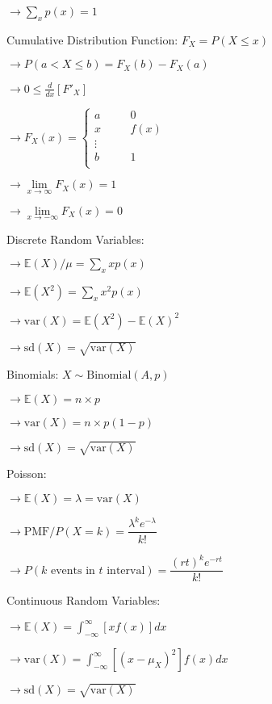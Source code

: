 \documentclass[10pt, letterpaper]{paper}
\begin{document}
\begin{multicols*}{2}
        $\rightarrow \sum\limits_{x}p(x) = 1$

        Cumulative Distribution Function: $F_{X} = P(X \leq x)$

        $\rightarrow P(a < X \leq b) = F_{X}(b) - F_{X}(a)$

        $\rightarrow 0 \leq \frac{d}{dx}[F'_{X}]$

        $\rightarrow F_{X}(x) = 
            \left\{
                \begin{array}{lcl}
                    a & \quad & 0   \\
                    x & \quad & f(x)\\
                    \vdots
                    &&              \\
                    b & \quad & 1   \\
                \end{array}
            \right.
        $

        $\rightarrow \lim\limits_{x \to \infty}F_{X}(x) = 1$

        $\rightarrow \lim\limits_{x \to -\infty}F_{X}(x) = 0$

        Discrete Random Variables:

        $\rightarrow\mathbb{E}(X)/\mu = \sum\limits_{x}xp(x)$

        $\rightarrow\mathbb{E}(X^{2}) = \sum\limits_{x}x^{2}p(x)$

        $\rightarrow\text{var}(X) = \mathbb{E}(X^{2}) - \mathbb{E}(X)^{2}$

        $\rightarrow\text{sd}(X) = \sqrt{\text{var}(X)}$
        
        Binomials: $X \sim \text{Binomial}(A, p)$
        
        $\rightarrow\mathbb{E}(X) = n \times p$
        
        $\rightarrow\text{var}(X) = n \times p(1-p)$
        
        $\rightarrow\text{sd}(X) = \sqrt{\text{var}(X)}$

        \columnbreak

        Poisson:

        $\rightarrow\mathbb{E}(X) = \lambda = \text{var}(X)$

        $\rightarrow\text{PMF}/P(X=k) = \dfrac{\lambda^{k}e^{-\lambda}}{k!}$

        $\rightarrow P(\text{$k$ events in $t$ interval}) = \dfrac{(rt)^{k}e^{-rt}}{k!}$      

        Continuous Random Variables: 
        
        $\rightarrow\mathbb{E}(X) = \int_{-\infty}^{\infty}\left[xf(x)\right]dx$ 
        
        $\rightarrow\text{var}(X) = \int_{-\infty}^{\infty}\left[(x - \mu_X)^2\right]f(x)dx$
        
        $\rightarrow\text{sd}(X) = \sqrt{\text{var}(X)}$
    \end{multicols*}
\end{document}
